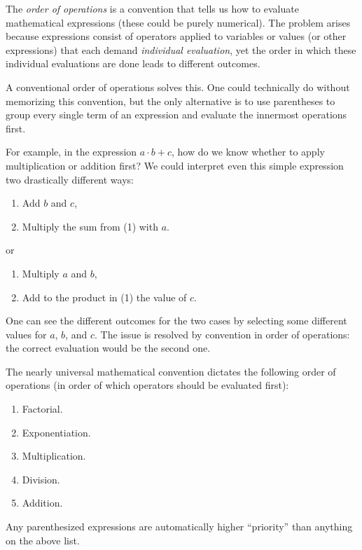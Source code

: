 \documentclass[12pt]{article}
\begin{document}
The \emph{order of operations} is a convention that tells us how to evaluate mathematical expressions (these could be purely numerical).  The problem arises because expressions consist of operators applied to variables or values (or other expressions) that each demand \emph{individual evaluation}, yet the order in which these individual evaluations are done leads to different outcomes.  

A conventional order of operations solves this.  One could technically do without memorizing this convention, but the only alternative is to use parentheses to group every single term of an expression and evaluate the innermost operations first.

For example, in the expression $a\cdot b + c$, how do we know whether to apply multiplication or addition first?  We could interpret even this simple  expression two drastically different ways:

\begin{enumerate}
\item Add $b$ and $c$,
\item Multiply the sum from (1) with $a$.
\end{enumerate}

or

\begin{enumerate}
\item Multiply $a$ and $b$,
\item Add to the product in (1) the value of $c$.
\end{enumerate}

One can see the different outcomes for the two cases by selecting some different values for $a$, $b$, and $c$.  The issue is resolved by convention in order of operations: the correct evaluation would be the second one.  

The nearly universal mathematical convention dictates the following order of operations (in order of which operators should be evaluated first):

\begin{enumerate}
\item Factorial.
\item Exponentiation.
\item Multiplication.
\item Division.
\item Addition.
\end{enumerate}

Any parenthesized expressions are automatically higher ``priority'' than anything on the above list.  
\end{document}
